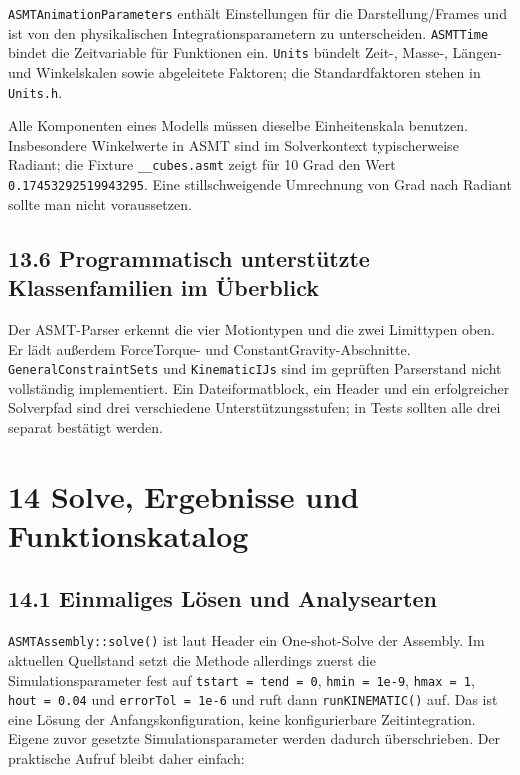 \documentclass[
  12pt
]{book}
\begin{document}
\texttt{ASMTAnimationParameters} enthält Einstellungen für die
Darstellung/Frames und ist von den physikalischen Integrationsparametern
zu unterscheiden. \texttt{ASMTTime} bindet die Zeitvariable für
Funktionen ein. \texttt{Units} bündelt Zeit-, Masse-, Längen- und
Winkelskalen sowie abgeleitete Faktoren; die Standardfaktoren stehen in
\texttt{Units.h}.

Alle Komponenten eines Modells müssen dieselbe Einheitenskala benutzen.
Insbesondere Winkelwerte in ASMT sind im Solverkontext typischerweise
Radiant; die Fixture \texttt{\_\_cubes.asmt} zeigt für 10 Grad den Wert
\texttt{0.17453292519943295}. Eine stillschweigende Umrechnung von Grad
nach Radiant sollte man nicht voraussetzen.

\hypertarget{programmatisch-unterstuxfctzte-klassenfamilien-im-uxfcberblick}{%
\section{\texorpdfstring{{13.6} Programmatisch unterstützte
Klassenfamilien im
Überblick}{13.6 Programmatisch unterstützte Klassenfamilien im Überblick}}\label{programmatisch-unterstuxfctzte-klassenfamilien-im-uxfcberblick}}

Der ASMT-Parser erkennt die vier Motiontypen und die zwei Limittypen
oben. Er lädt außerdem ForceTorque- und ConstantGravity-Abschnitte.
\texttt{GeneralConstraintSets} und \texttt{KinematicIJs} sind im
geprüften Parserstand nicht vollständig implementiert. Ein
Dateiformatblock, ein Header und ein erfolgreicher Solverpfad sind drei
verschiedene Unterstützungsstufen; in Tests sollten alle drei separat
bestätigt werden.

\hypertarget{kap-solve-ergebnisse}{%
\chapter{\texorpdfstring{{14} Solve, Ergebnisse und
Funktionskatalog}{14 Solve, Ergebnisse und Funktionskatalog}}\label{kap-solve-ergebnisse}}

\hypertarget{einmaliges-luxf6sen-und-analysearten}{%
\section{\texorpdfstring{{14.1} Einmaliges Lösen und
Analysearten}{14.1 Einmaliges Lösen und Analysearten}}\label{einmaliges-luxf6sen-und-analysearten}}

\texttt{ASMTAssembly::solve()} ist laut Header ein One-shot-Solve der
Assembly. Im aktuellen Quellstand setzt die Methode allerdings zuerst
die Simulationsparameter fest auf \texttt{tstart\ =\ tend\ =\ 0},
\texttt{hmin\ =\ 1e-9}, \texttt{hmax\ =\ 1}, \texttt{hout\ =\ 0.04} und
\texttt{errorTol\ =\ 1e-6} und ruft dann \texttt{runKINEMATIC()} auf.
Das ist eine Lösung der Anfangskonfiguration, keine konfigurierbare
Zeitintegration. Eigene zuvor gesetzte Simulationsparameter werden
dadurch überschrieben. Der praktische Aufruf bleibt daher einfach:
\end{document}
